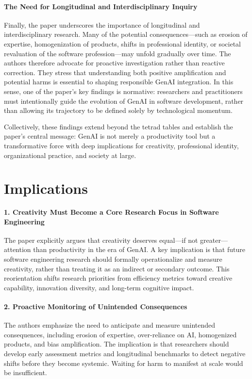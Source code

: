 \paragraph{The Need for Longitudinal and Interdisciplinary Inquiry}
Finally, the paper underscores the importance of longitudinal and interdisciplinary research. Many of the potential consequences—such as erosion of expertise, homogenization of products, shifts in professional identity, or societal revaluation of the software profession—may unfold gradually over time. The authors therefore advocate for proactive investigation rather than reactive correction. They stress that understanding both positive amplification and potential harms is essential to shaping responsible GenAI integration. In this sense, one of the paper’s key findings is normative: researchers and practitioners must intentionally guide the evolution of GenAI in software development, rather than allowing its trajectory to be defined solely by technological momentum.

Collectively, these findings extend beyond the tetrad tables and establish the paper’s central message: GenAI is not merely a productivity tool but a transformative force with deep implications for creativity, professional identity, organizational practice, and society at large.

\section{Implications}
\paragraph{1. Creativity Must Become a Core Research Focus in Software Engineering}
The paper explicitly argues that creativity deserves equal—if not greater—attention than productivity in the era of GenAI. A key implication is that future software engineering research should formally operationalize and measure creativity, rather than treating it as an indirect or secondary outcome. This reorientation shifts research priorities from efficiency metrics toward creative capability, innovation diversity, and long-term cognitive impact.

\paragraph{2. Proactive Monitoring of Unintended Consequences}
The authors emphasize the need to anticipate and measure unintended consequences, including erosion of expertise, over-reliance on AI, homogenized products, and bias amplification. The implication is that researchers should develop early assessment metrics and longitudinal benchmarks to detect negative shifts before they become systemic. Waiting for harm to manifest at scale would be insufficient.

